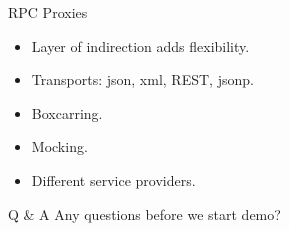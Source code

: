 \documentclass{beamer}
\begin{document}
\begin{frame}{RPC Proxies}
  \begin{itemize}
  \item Layer of indirection adds flexibility.
  \item Transports: json, xml, REST, jsonp.
  \item Boxcarring.
  \item Mocking.
  \item Different service providers.
  \end{itemize}
\end{frame}

\begin{frame}{Q \& A}
  Any questions before we start demo?
\end{frame}
\end{document}
